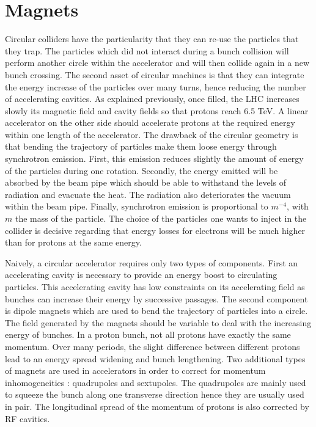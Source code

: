 \section{Magnets}
\label{sec:orgb3bba33}
Circular colliders have the particularity that they can re-use the particles that they trap.
The particles which did not interact during a bunch collision will perform another circle within the accelerator and will then collide again in a new bunch crossing.
The second asset of circular machines is that they can integrate the energy increase of the particles over many turns, hence reducing the number of accelerating cavities.
As explained previously, once filled, the LHC increases slowly its magnetic field and cavity fields so that protons reach 6.5 TeV.
A linear accelerator on the other side should accelerate protons at the required energy within one length of the accelerator.
The drawback of the circular geometry is that bending the trajectory of particles make them loose energy through synchrotron emission.
First, this emission reduces slightly the amount of energy of the particles during one rotation.
Secondly, the energy emitted will be absorbed by the beam pipe which should be able to withstand the levels of radiation and evacuate the heat.
The radiation also deteriorates the vacuum within the beam pipe.
Finally, synchrotron emission is proportional to $m^{-4}$, with $m$ the mass of the particle.
The choice of the particles one wants to inject in the collider is decisive regarding that energy losses for electrons will be much higher than for protons at the same energy.


Naively, a circular accelerator requires only two types of components.
First an accelerating cavity is necessary to provide an energy boost to circulating particles.
This accelerating cavity has low constraints on its accelerating field as bunches can increase their energy by successive passages.
The second component is dipole magnets which are used to bend the trajectory of particles into a circle.
The field generated by the magnets should be variable to deal with the increasing energy of bunches.
In a proton bunch, not all protons have exactly the same momentum.
Over many periods, the slight difference between different protons lead to an energy spread widening and bunch lengthening.
Two additional types of magnets are used in accelerators in order to correct for momentum inhomogeneities : quadrupoles and sextupoles.
The quadrupoles are mainly used to squeeze the bunch along one transverse direction hence they are usually used in pair.
The longitudinal spread of the momentum of protons is also corrected by RF cavities.


